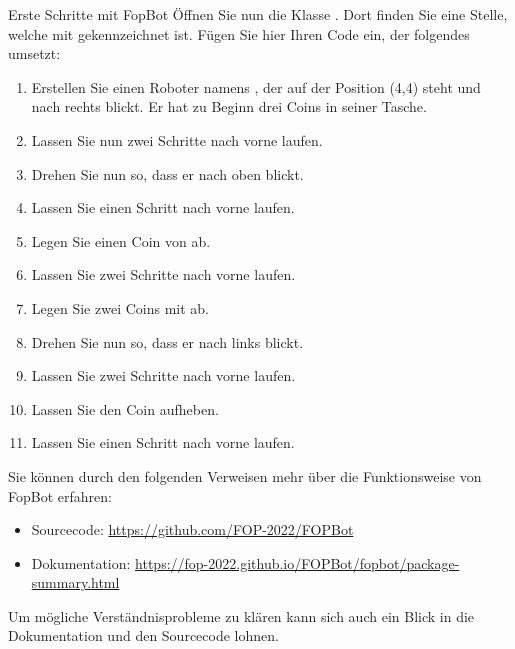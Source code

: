 \documentclass{../tuda-exercise}
\begin{document}
  \begin{task}[credit=\stars{1}{3}]{Erste Schritte mit FopBot}
    Öffnen Sie nun die Klasse . Dort finden Sie eine Stelle,
    welche mit  gekennzeichnet ist. Fügen Sie hier Ihren Code ein, der folgendes
    umsetzt:

    \begin{enumerate}
      \item Erstellen Sie einen Roboter namens ,  der auf der Position (4,4)
      steht und nach rechts blickt. Er hat zu Beginn drei Coins in seiner Tasche.
      \item Lassen Sie  nun zwei Schritte nach vorne laufen.
      \item Drehen Sie  nun so, dass er nach oben blickt.
      \item Lassen Sie  einen Schritt nach vorne laufen.
      \item Legen Sie einen Coin von  ab.
      \item Lassen Sie  zwei Schritte nach vorne laufen.
      \item Legen Sie zwei Coins mit  ab.
      \item Drehen Sie  nun so, dass er nach links blickt.
      \item Lassen Sie  zwei Schritte nach vorne laufen.
      \item Lassen Sie  den Coin aufheben.
      \item Lassen Sie  einen Schritt nach vorne laufen.
    \end{enumerate}

    \br

    \begin{note}[title=Hinweis:, color=tuda-orange]
      Sie können durch den folgenden Verweisen mehr über die Funktionsweise von FopBot erfahren:

      \begin{itemize}
        \item Sourcecode: \url{https://github.com/FOP-2022/FOPBot}
        \item Dokumentation: \url{https://fop-2022.github.io/FOPBot/fopbot/package-summary.html}
      \end{itemize}

      Um mögliche Verständnisprobleme zu klären kann sich auch ein Blick in die Dokumentation und
      den Sourcecode lohnen.
    \end{note}


\end{task}
\end{document}
